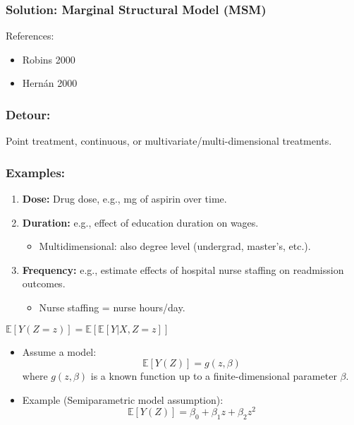 \subsubsection*{Solution: Marginal Structural Model (MSM)}
References:
\begin{itemize}
    \item Robins 2000
    \item Hernán 2000
\end{itemize}

\subsubsection*{Detour:}
Point treatment, continuous, or multivariate/multi-dimensional treatments.

\subsubsection*{Examples:}
\begin{enumerate}
    \item \textbf{Dose:} Drug dose, e.g., mg of aspirin over time.
    \item \textbf{Duration:} e.g., effect of education duration on wages.
    \begin{itemize}
        \item Multidimensional: also degree level (undergrad, master’s, etc.).
    \end{itemize}
    \item \textbf{Frequency:} e.g., estimate effects of hospital nurse staffing on readmission outcomes.
    \begin{itemize}
        \item Nurse staffing = nurse hours/day.
    \end{itemize}
\end{enumerate}
                                    
$\mathbb{E}[Y(Z=z)] = \mathbb{E}[\mathbb{E}[Y|X,Z=z]]$

\begin{itemize}
    \item Assume a model:
    \[
    \mathbb{E}[Y(Z)] = g(z, \beta)
    \]
    where $g(z, \beta)$ is a known function up to a finite-dimensional parameter $\beta$.
    
    \item Example (Semiparametric model assumption):
    \[
    \mathbb{E}[Y(Z)] = \beta_0 + \beta_1 z + \beta_2 z^2
    \]
\end{itemize}

